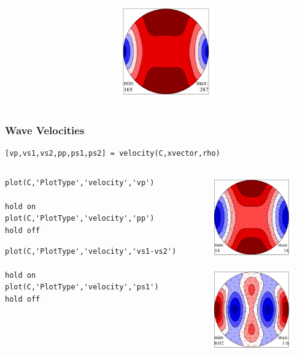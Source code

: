 \begin{frame}[fragile]
\begin{onlyenv}
\begin{columns}
\begin{column}{7.7cm}
    \end{column}
    \begin{column}{4cm}
      \includegraphics[width=4cm]{pic/YM}
    \end{column}
  \end{columns}
\end{onlyenv}
\end{frame}


\begin{frame}[fragile]
  \frametitle{Wave Velocities}

\begin{lstlisting}
[vp,vs1,vs2,pp,ps1,ps2] = velocity(C,xvector,rho)
\end{lstlisting}

  \begin{columns}
  \begin{column}{8.5cm}

\begin{lstlisting}
plot(C,'PlotType','velocity','vp')

hold on
plot(C,'PlotType','velocity','pp')
hold off
\end{lstlisting}

\bigskip
\pause

    \begin{lstlisting}
plot(C,'PlotType','velocity','vs1-vs2')

hold on
plot(C,'PlotType','velocity','ps1')
hold off
\end{lstlisting}

  \end{column}
    \begin{column}{3.5cm}
      \includegraphics[width=3.5cm]{pic/vp-pp}

      \includegraphics[width=3.5cm]{pic/vs12-ps1}
  \end{column}

  \end{columns}

\end{frame}

